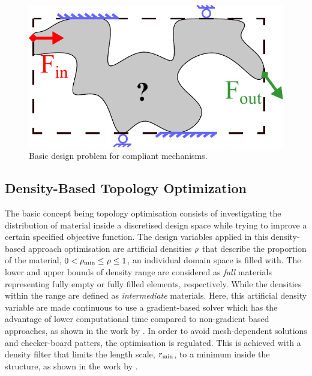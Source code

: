 \begin{figure}[hbt!]
    \centering
    \includegraphics[width=0.5\columnwidth]{images/chap5/TOM-wp.pdf}
    \caption{Basic design problem for compliant mechanisms.}
    \label{fig:ComplProb}
\end{figure}

\subsection{Density-Based Topology Optimization}
The basic concept being topology optimisation consists of investigating the distribution of material inside a discretised design space while trying to improve a certain specified objective function. The design variables applied in this density-based approach optimisation are artificial densities $\rho$ that describe the proportion of the material, $0<\rho_\text{min} \leq \rho \leq 1$, an individual domain space is filled with. The lower and upper bounds of density range are considered as \textit{full} materials representing fully empty or fully filled elements, respectively. While the densities within the range are defined as \textit{intermediate} materials. Here, this artificial density variable are made continuous to use a gradient-based solver which has the advantage of lower computational time compared to non-gradient based approaches, as shown in the work by \cite{sigmundUsefulnessNongradientApproaches2011}. In order to avoid mesh-dependent solutions and checker-board patters, the optimisation is regulated. This is achieved with a density filter that limits the length scale, $r_\text{min}$, to a minimum inside the structure, as shown in the work by \cite{bendsoeTopologyOptimizationTheory2013}.

